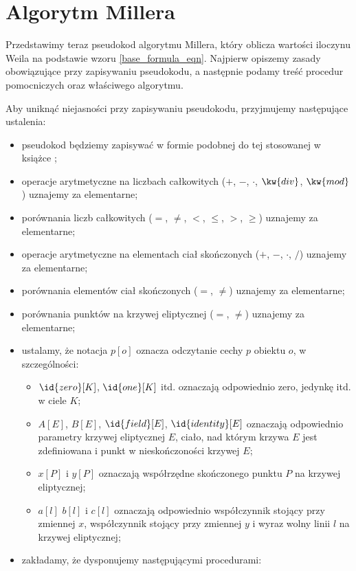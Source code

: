 \section{Algorytm Millera}

\noindent
Przedstawimy teraz pseudokod algorytmu Millera,
który oblicza wartości iloczynu Weila
na podstawie wzoru \ref{base_formula_eqn}.
Najpierw opiszemy zasady obowiązujące przy zapisywaniu pseudokodu,
a następnie podamy treść procedur pomocniczych
oraz właściwego algorytmu.

\begin{remark}
Aby uniknąć niejasności przy zapisywaniu pseudokodu,
przyjmujemy następujące ustalenia:
\begin{itemize}
\item pseudokod będziemy zapisywać w formie podobnej do tej
stosowanej w książce \cite{clrs};
\item operacje arytmetyczne na liczbach całkowitych
($+$, $-$, $\cdot$, $\kw{div}$, $\kw{mod}$)
uznajemy za elementarne;
\item porównania liczb całkowitych
($=$, $\neq$, $<$, $\leq$, $>$, $\geq$)
uznajemy za elementarne;
\item operacje arytmetyczne na elementach ciał skończonych
($+$, $-$, $\cdot$, $/$)
uznajemy za elementarne;
\item porównania elementów ciał skończonych
($=$, $\neq$)
uznajemy za elementarne;
\item porównania punktów na krzywej eliptycznej
($=$, $\neq$)
uznajemy za elementarne;
\item ustalamy, że notacja $p[o]$ oznacza odczytanie cechy $p$ obiektu $o$,
w szczególności:
\begin{itemize}
\item $\id{zero}[K]$, $\id{one}[K]$ itd.
oznaczają odpowiednio
zero, jedynkę itd. w ciele $K$;
\item $A[E]$, $B[E]$, $\id{field}[E]$, $\id{identity}[E]$
oznaczają odpowiednio
parametry krzywej eliptycznej $E$,
ciało, nad którym krzywa $E$ jest zdefiniowana
i punkt w nieskończoności krzywej $E$;
\item $x[P]$ i $y[P]$ oznaczają współrzędne skończonego punktu $P$
na krzywej eliptycznej;
\item $a[l]$ $b[l]$ i $c[l]$ oznaczają odpowiednio
współczynnik stojący przy zmiennej $x$,
współczynnik stojący przy zmiennej $y$
i wyraz wolny linii $l$ na krzywej eliptycznej;
\end{itemize}
\item zakładamy, że dysponujemy następującymi procedurami:

\end{itemize}
\end{remark}
